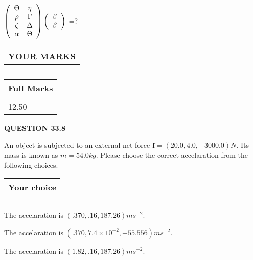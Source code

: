 \documentclass[12pt]{article}
\begin{document}
 
$  %
 \left( \begin{array}
 {
 c
 c
 }
 \Theta & 
 \eta \\ 
 \rho & 
 \Gamma \\ 
                    \zeta & 
 \Delta \\ 
 \alpha & 
 \Theta
 \end{array} \right)
 \left( \begin{array}
 {
 c
 }
 \beta \\ 
 \beta
 \end{array} \right)
$ =?
 

 

 
\vspace{0.3in}
  
\vspace{0.2in}
  
\noindent\begin{tabular}{|l|}
\hline
 YOUR MARKS  \\
\hline
 \\ 
 \\ 
\hline
\end{tabular}
\hspace{0.05in} \begin{tabular}{|l|}
\hline
 Full Marks  \\
\hline
 \\ 
12.50 \\
\hline
\end{tabular}
{\textbf{\Large{QUESTION
33.8 
}}}
  
  
 
An object is subjected to an external net force $\mathbf{f}=
(20.0 , 4.0 , -3000.0) N$.
Its mass is known as $m= %
54.0 kg$.
Please choose the correct accelaration from the following choices.
  
  
\noindent\hspace{3.0in} \begin{tabular}{|l|}
\hline
Your choice \\
\hline
 \\ 
 \\ 
\hline
\end{tabular}
  
  
 
 
  The accelaration is $  %
(
.370,
.16,
187.26)
ms^{-2} $.
 
 
  The accelaration is $  %
(
.370,
7.4 \times 10^{-2},
-55.556)
ms^{-2} $.
 
 
  The accelaration is $  %
(
1.82,
.16,
187.26)
ms^{-2} $.
 
\end{document}
